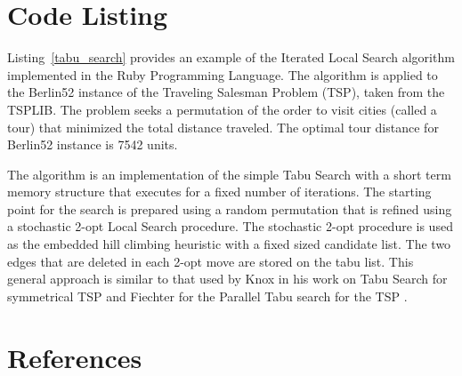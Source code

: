 \documentclass[a4paper, 11pt]{article}
\begin{document}
\section{Code Listing}
\label{sec:code}
Listing~\ref{tabu_search} provides an example of the Iterated Local Search algorithm implemented in the Ruby Programming Language. 
The algorithm is applied to the Berlin52 instance of the Traveling Salesman Problem (TSP), taken from the TSPLIB. The problem seeks a permutation of the order to visit cities (called a tour) that minimized the total distance traveled. The optimal tour distance for Berlin52 instance is 7542 units.

The algorithm is an implementation of the simple Tabu Search with a short term memory structure that executes for a fixed number of iterations. The starting point for the search is prepared using a random permutation that is refined using a stochastic 2-opt Local Search procedure. The stochastic 2-opt procedure is used as the embedded hill climbing heuristic with a fixed sized candidate list. The two edges that are deleted in each 2-opt move are stored on the tabu list. This general approach is similar to that used by Knox in his work on Tabu Search for symmetrical TSP \cite{Knox1994} and Fiechter for the Parallel Tabu search for the TSP \cite{Fiechter1994}.



\section{References}
\label{sec:references}
\end{document}
